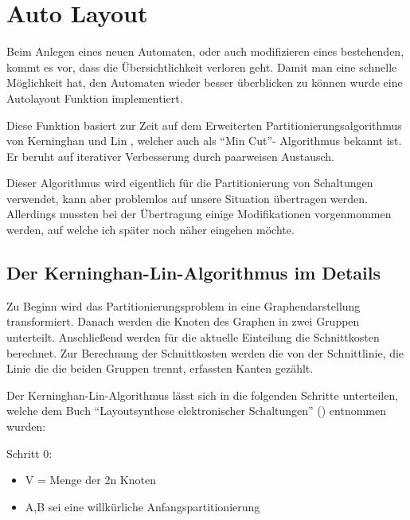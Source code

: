

\chapter{Auto Layout}\label{AutoLayout}

Beim Anlegen eines neuen Automaten, oder auch modifizieren eines bestehenden,
kommt es vor, dass die Übersichtlichkeit verloren geht. Damit man eine schnelle
Möglichkeit hat, den Automaten wieder besser überblicken zu können wurde eine
Autolayout Funktion implementiert.\vspace{10pt}

Diese Funktion basiert zur Zeit auf dem Erweiterten Partitionierungsalgorithmus
von Kerninghan und Lin , welcher auch als "`Min Cut"'- Algorithmus
bekannt ist. Er beruht auf iterativer Verbesserung durch paarweisen
Austausch.\vspace{10pt}

Dieser Algorithmus wird eigentlich für die Partitionierung von Schaltungen
verwendet, kann aber problemlos auf unsere Situation übertragen werden.
Allerdings mussten bei der Übertragung einige Modifikationen
vorgenmommen werden, auf welche ich später noch näher eingehen
möchte.\vspace{10pt}

\section{Der Kerninghan-Lin-Algorithmus im Details}

Zu Beginn wird das Partitionierungsproblem in eine Graphendarstellung
transformiert. Danach werden die Knoten des Graphen in zwei Gruppen unterteilt.
Anschließend werden für die aktuelle Einteilung die Schnittkosten berechnet.
Zur Berechnung der Schnittkosten werden die von der Schnittlinie, die Linie die
die beiden Gruppen trennt, erfassten Kanten gezählt.\vspace{10pt}

Der Kerninghan-Lin-Algorithmus lässt sich in die folgenden Schritte
unterteilen, welche dem Buch "`Layoutsynthese elektronischer
Schaltungen"' () entnommen wurden:\vspace{10pt}

Schritt 0:
\begin{itemize}
  \item V = Menge der 2n Knoten 
  \item {A,B} sei eine willkürliche Anfangspartitionierung
\end{itemize}

